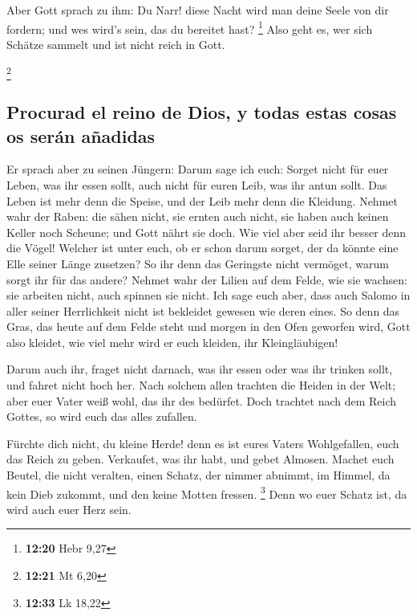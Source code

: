  Aber Gott sprach zu ihm: Du Narr! diese Nacht wird man
deine Seele von dir fordern; und wes wird's sein, das du bereitet hast?
\footnote{\textbf{12:20} Hebr 9,27}  Also geht es, wer
sich Schätze sammelt und ist nicht reich in Gott.

\footnote{\textbf{12:21} Mt 6,20}

\hypertarget{procurad-el-reino-de-dios-y-todas-estas-cosas-os-seruxe1n-auxf1adidas}{%
\subsection{Procurad el reino de Dios, y todas estas cosas os serán
añadidas}\label{procurad-el-reino-de-dios-y-todas-estas-cosas-os-seruxe1n-auxf1adidas}}

 Er sprach aber zu seinen Jüngern: Darum sage ich euch:
Sorget nicht für euer Leben, was ihr essen sollt, auch nicht für euren
Leib, was ihr antun sollt.  Das Leben ist mehr denn die
Speise, und der Leib mehr denn die Kleidung.  Nehmet wahr
der Raben: die sähen nicht, sie ernten auch nicht, sie haben auch keinen
Keller noch Scheune; und Gott nährt sie doch. Wie viel aber seid ihr
besser denn die Vögel!  Welcher ist unter euch, ob er
schon darum sorget, der da könnte eine Elle seiner Länge zusetzen?
 So ihr denn das Geringste nicht vermöget, warum sorgt
ihr für das andere?  Nehmet wahr der Lilien auf dem
Felde, wie sie wachsen: sie arbeiten nicht, auch spinnen sie nicht. Ich
sage euch aber, dass auch Salomo in aller seiner Herrlichkeit nicht ist
bekleidet gewesen wie deren eines.  So denn das Gras, das
heute auf dem Felde steht und morgen in den Ofen geworfen wird, Gott
also kleidet, wie viel mehr wird er euch kleiden, ihr Kleingläubigen!

 Darum auch ihr, fraget nicht darnach, was ihr essen oder
was ihr trinken sollt, und fahret nicht hoch her.  Nach
solchem allen trachten die Heiden in der Welt; aber euer Vater weiß
wohl, das ihr des bedürfet.  Doch trachtet nach dem Reich
Gottes, so wird euch das alles zufallen.

 Fürchte dich nicht, du kleine Herde! denn es ist eures
Vaters Wohlgefallen, euch das Reich zu geben.  Verkaufet,
was ihr habt, und gebet Almosen. Machet euch Beutel, die nicht veralten,
einen Schatz, der nimmer abnimmt, im Himmel, da kein Dieb zukommt, und
den keine Motten fressen. \footnote{\textbf{12:33} Lk 18,22}
 Denn wo euer Schatz ist, da wird auch euer Herz sein.

